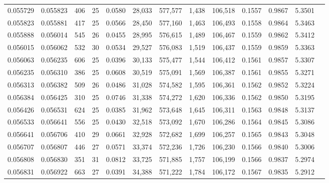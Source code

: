 \begin{tabular}{rrrrrrrrrrrrr}
0.055729 & 0.055823 & 406 &  25 &                                     0.0580 &  28,033 & 577,577 &   1,438 & 106,518 & 0.1557 & 0.9867 & 5.3501 \\
0.055823 & 0.055881 & 417 &  25 &                                     0.0566 &  28,450 & 577,160 &   1,463 & 106,493 & 0.1558 & 0.9864 & 5.3463 \\
0.055888 & 0.056014 & 545 &  26 &                                     0.0455 &  28,995 & 576,615 &   1,489 & 106,467 & 0.1559 & 0.9862 & 5.3412 \\
0.056015 & 0.056062 & 532 &  30 &                                     0.0534 &  29,527 & 576,083 &   1,519 & 106,437 & 0.1559 & 0.9859 & 5.3363 \\
0.056063 & 0.056235 & 606 &  25 &                                     0.0396 &  30,133 & 575,477 &   1,544 & 106,412 & 0.1561 & 0.9857 & 5.3307 \\
0.056235 & 0.056310 & 386 &  25 &                                     0.0608 &  30,519 & 575,091 &   1,569 & 106,387 & 0.1561 & 0.9855 & 5.3271 \\
0.056313 & 0.056382 & 509 &  26 &                                     0.0486 &  31,028 & 574,582 &   1,595 & 106,361 & 0.1562 & 0.9852 & 5.3224 \\
0.056384 & 0.056425 & 310 &  25 &                                     0.0746 &  31,338 & 574,272 &   1,620 & 106,336 & 0.1562 & 0.9850 & 5.3195 \\
0.056426 & 0.056531 & 624 &  25 &                                     0.0385 &  31,962 & 573,648 &   1,645 & 106,311 & 0.1563 & 0.9848 & 5.3137 \\
0.056533 & 0.056641 & 556 &  25 &                                     0.0430 &  32,518 & 573,092 &   1,670 & 106,286 & 0.1564 & 0.9845 & 5.3086 \\
0.056641 & 0.056706 & 410 &  29 &                                     0.0661 &  32,928 & 572,682 &   1,699 & 106,257 & 0.1565 & 0.9843 & 5.3048 \\
0.056707 & 0.056807 & 446 &  27 &                                     0.0571 &  33,374 & 572,236 &   1,726 & 106,230 & 0.1566 & 0.9840 & 5.3006 \\
0.056808 & 0.056830 & 351 &  31 &                                     0.0812 &  33,725 & 571,885 &   1,757 & 106,199 & 0.1566 & 0.9837 & 5.2974 \\
0.056831 & 0.056922 & 663 &  27 &                                     0.0391 &  34,388 & 571,222 &   1,784 & 106,172 & 0.1567 & 0.9835 & 5.2912 \\

\end{tabular}
